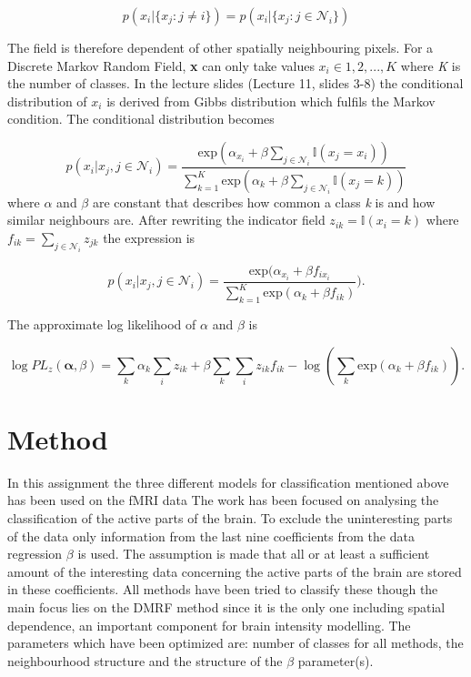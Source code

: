 \documentclass[a4paper,english]{article}
\begin{document}
\begin{equation}
	p(x_i|\{x_j : j\neq i\}) = p(x_i|\{x_j : j\in \mathcal{N}_i\})
	\label{eq:markov}
\end{equation}

The field is therefore dependent of other spatially neighbouring pixels. For a Discrete Markov Random Field, \textbf{x} can only take values $x_i \in 1,2,...,K$ where \textit{K} is the number of classes. In the lecture slides (Lecture 11, slides 3-8\cite{L11}) the conditional distribution of $x_i$ is derived from Gibbs distribution which fulfils the Markov condition. The conditional distribution becomes

\begin{equation}
p(x_i|x_j,j\in \mathcal{N}_i) = \dfrac{\text{exp}(\alpha_{x_i}+\beta\sum_{j\in \mathcal{N}_i}\mathds{I}(x_j = x_i))}{\sum^K_{k=1}\text{exp}(\alpha_k + \beta\sum_{j\in \mathcal{N}_i}\mathds{I}(x_j = k))}
\end{equation}
where $\alpha$ and $\beta$ are constant that describes how common a class \textit{k} is and how similar neighbours are. After rewriting the indicator field $z_{ik} = \mathds{I}(x_i = k)$ where $f_{ik} = \sum_{j\in \mathcal{N}_i} z_{jk}$ the expression is

\begin{equation}
  p(x_i|x_j,j\in \mathcal{N}_i) = \dfrac{\text{exp}(\alpha_{x_i}+\beta f_{ix_i} }{\sum^K_{k=1}\text{exp}(\alpha_k + \beta f_{ik})}).
\end{equation}

The approximate log likelihood of $\alpha$ and $\beta$ is

\begin{equation}
  \log PL_z(\boldsymbol{\alpha},\beta) = \sum_k \alpha_k \sum_i z_{ik} + \beta \sum_k \sum_i z_{ik}f_{ik} - \log\left(\sum_k \text{exp}(\alpha_k + \beta f_{ik})\right).
\end{equation}



\section{Method}
In this assignment the three different models for classification mentioned above has been used on the fMRI data
The work has been focused on analysing the classification of the active parts of the brain.
To exclude the uninteresting parts of the data only information from the last nine coefficients from the data regression $\beta$ is used.
The assumption is made that all or at least a sufficient amount of the interesting data concerning the active parts of the brain are stored in these coefficients.
All methods have been tried to classify these though the main focus lies on the DMRF method since it is the only one including spatial dependence, an important component for brain intensity modelling.
The parameters which have been optimized are: number of classes for all methods, the neighbourhood structure and the structure of the $\beta$ parameter(s).
\end{document}
